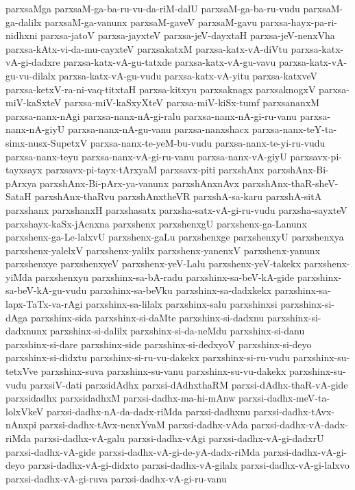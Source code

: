 {parxsaMga
parxsaM-ga-ba-ru-vu-da-riM-dalU
parxsaM-ga-ba-ru-vudu
parxsaM-ga-dalilx
parxsaM-ga-vanunx
parxsaM-gaveV
parxsaM-gavu
parxsa-hayx-pa-ri-nidhxni
parxsa-jatoV
parxsa-jayxteV
parxsa-jeV-dayxtaH
parxsa-jeV-nenxVha
parxsa-kAtx-vi-da-mu-cayxteV
parxsakatxM
parxsa-katx-vA-diVtu
parxsa-katx-vA-gi-dadxre
parxsa-katx-vA-gu-tatxde
parxsa-katx-vA-gu-vavu
parxsa-katx-vA-gu-vu-dilalx
parxsa-katx-vA-gu-vudu
parxsa-katx-vA-yitu
parxsa-katxveV
parxsa-ketxV-ra-ni-vaq-titxtaH
parxsa-kitxyu
parxsaknagx
parxsaknogxV
parxsa-miV-kaSxteV
parxsa-miV-kaSxyXteV
parxsa-miV-kiSx-tumf
parxsananxM
parxsa-nanx-nAgi
parxsa-nanx-nA-gi-ralu
parxsa-nanx-nA-gi-ru-vanu
parxsa-nanx-nA-giyU
parxsa-nanx-nA-gu-vanu
parxsa-nanxshacx
parxsa-nanx-teY-ta-simx-nusx-SupetxV
parxsa-nanx-te-yeM-bu-vudu
parxsa-nanx-te-yi-ru-vudu
parxsa-nanx-teyu
parxsa-nanx-vA-gi-ru-vanu
parxsa-nanx-vA-giyU
parxsavx-pi-tayxsayx
parxsavx-pi-tayx-tArxyaM
parxsavx-piti
parxshAnx
parxshAnx-Bi-pArxya
parxshAnx-Bi-pArx-ya-vanunx
parxshAnxnAvx
parxshAnx-thaR-sheV-SataH
parxshAnx-thaRvu
parxshAnxtheVR
parxshA-sa-karu
parxshA-sitA
parxshanx
parxshanxH
parxshasatx
parxsha-satx-vA-gi-ru-vudu
parxsha-sayxteV
parxshayx-kaSx-jAcnxna
parxshenx
parxshenxgU
parxshenx-ga-Lanunx
parxshenx-ga-Le-lalxvU
parxshenx-gaLu
parxshenxge
parxshenxyU
parxshenxya
parxshenx-yalelxV
parxshenx-yalilx
parxshenx-yanenxV
parxshenx-yanunx
parxshenxye
parxshenxyeV
parxshenx-yeV-Lalu
parxshenx-yeV-takekx
parxshenx-yiMda
parxshenxyu
parxshinx-sa-bA-radu
parxshinx-sa-beV-kA-gide
parxshinx-sa-beV-kA-gu-vudu
parxshinx-sa-beVku
parxshinx-sa-dadxkekx
parxshinx-sa-lapx-TaTx-va-rAgi
parxshinx-sa-lilalx
parxshinx-salu
parxshinxsi
parxshinx-si-dAga
parxshinx-sida
parxshinx-si-daMte
parxshinx-si-dadxnu
parxshinx-si-dadxnunx
parxshinx-si-dalilx
parxshinx-si-da-neMdu
parxshinx-si-danu
parxshinx-si-dare
parxshinx-side
parxshinx-si-dedxyoV
parxshinx-si-deyo
parxshinx-si-didxtu
parxshinx-si-ru-vu-dakekx
parxshinx-si-ru-vudu
parxshinx-su-tetxVve
parxshinx-suva
parxshinx-su-vanu
parxshinx-su-vu-dakekx
parxshinx-su-vudu
parxsiV-dati
parxsidAdhx
parxsi-dAdhxthaRM
parxsi-dAdhx-thaR-vA-gide
parxsidadhx
parxsidadhxM
parxsi-dadhx-ma-hi-mAnw
parxsi-dadhx-meV-ta-lolxVkeV
parxsi-dadhx-nA-da-dadx-riMda
parxsi-dadhxnu
parxsi-dadhx-tAvx-nAnxpi
parxsi-dadhx-tAvx-nenxYvaM
parxsi-dadhx-vAda
parxsi-dadhx-vA-dadx-riMda
parxsi-dadhx-vA-galu
parxsi-dadhx-vAgi
parxsi-dadhx-vA-gi-dadxrU
parxsi-dadhx-vA-gide
parxsi-dadhx-vA-gi-de-yA-dadx-riMda
parxsi-dadhx-vA-gi-deyo
parxsi-dadhx-vA-gi-didxto
parxsi-dadhx-vA-gilalx
parxsi-dadhx-vA-gi-lalxvo
parxsi-dadhx-vA-gi-ruva
parxsi-dadhx-vA-gi-ru-vanu
}
